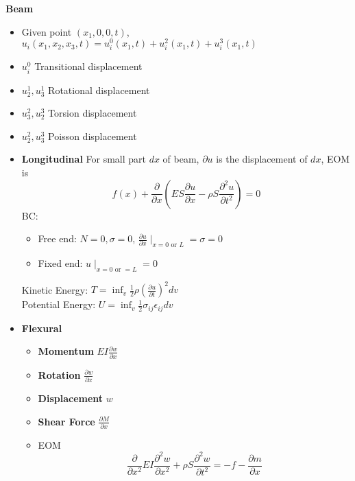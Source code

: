 \documentclass{article}
\begin{document}
\begin{multicols*}{2}
  \noindent\textbf{Beam}
  \begin{itemize}
  \item Given point $(x_1, 0, 0, t)$, $u_i(x_1, x_2, x_3, t) = u_i^0(x_1,t) + u_i^2(x_1,t) + u_i^3(x_1,t)$
  \item $u_i^0$ Transitional displacement
  \item $u_2^1, u_3^1$ Rotational displacement
  \item $u_3^2, u_2^3$ Torsion displacement
  \item $u_2^2, u_3^3$ Poisson displacement
  \item \textbf{Longitudinal} For small part $dx$ of beam, $\partial u$ is the displacement of $dx$, EOM is
    \begin{equation*}
      f(x) + \frac{\partial}{\partial x}(ES\frac{\partial u}{\partial x} -\rho S\frac{\partial^2 u}{\partial t^2}) = 0
    \end{equation*}
    BC:
    \begin{itemize}
    \item Free end: $N=0, \sigma=0$, $\frac{\partial u}{\partial x}\mid_{x=0 \text{ or } L} = \sigma = 0$
    \item Fixed end: $u\mid_{x=0 \text{ or } = L} = 0$
    \end{itemize}
    Kinetic Energy: $T = \inf_v \frac{1}{2} \rho (\frac{\partial u}{\partial t})^2 dv$\\
    Potential Energy: $U = \inf_v \frac{1}{2}\sigma_{ij} \epsilon_{ij} dv$

  \item\textbf{Flexural}
    \begin{itemize}
    \item \textbf{Momentum} $EI\frac{\partial w}{\partial x}$
    \item \textbf{Rotation} $\frac{\partial w}{\partial x}$
    \item \textbf{Displacement} $w$
    \item \textbf{Shear Force} $\frac{\partial M}{\partial x}$
    \item EOM
      \begin{equation*}
        \frac{\partial}{\partial x^2} EI\frac{\partial^2 w}{\partial x^2} + \rho S \frac{\partial^2 w}{\partial t^2} = -f - \frac{\partial m}{\partial x}
      \end{equation*}
    \end{itemize}



  \end{itemize}

\end{multicols*}
\end{document}
